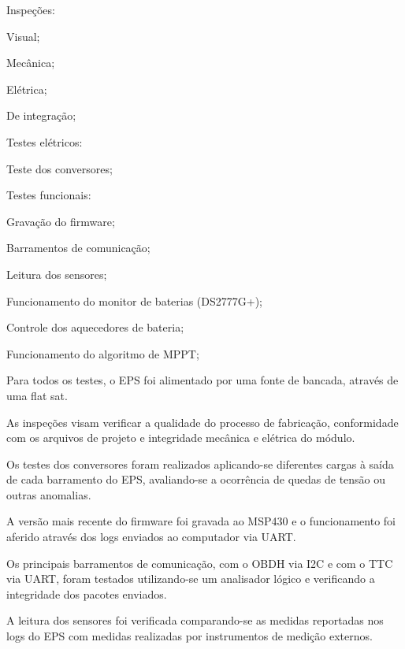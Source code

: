 \begin{alineas}
    \item Inspeções:
    \begin{alineas}
        \item Visual;
        \item Mecânica;
        \item Elétrica;
        \item De integração;
    \end{alineas}
    \item Testes elétricos:
    \begin{alineas}
        \item Teste dos conversores;
    \end{alineas}
    \item Testes funcionais:
    \begin{alineas}
        \item Gravação do firmware;
        \item Barramentos de comunicação;
        \item Leitura dos sensores;
        \item Funcionamento do monitor de baterias (DS2777G+);
        \item Controle dos aquecedores de bateria;
        \item Funcionamento do algoritmo de \gls{MPPT};
    \end{alineas}
\end{alineas}

Para todos os testes, o \gls{EPS} foi alimentado por uma fonte de bancada, através de uma flat sat.

As inspeções visam verificar a qualidade do processo de fabricação, conformidade com os arquivos de projeto e integridade mecânica e elétrica do módulo.

Os testes dos conversores foram realizados aplicando-se diferentes cargas à saída de cada barramento do \gls{EPS}, avaliando-se a ocorrência de quedas de tensão ou outras anomalias.

A versão mais recente do firmware foi gravada ao MSP430 e o funcionamento foi aferido através dos logs enviados ao computador via \gls{UART}.

Os principais barramentos de comunicação, com o \gls{OBDH} via \gls{I2C} e com o \gls{TTC} via \gls{UART}, foram testados utilizando-se um analisador lógico e verificando a integridade dos pacotes enviados.

A leitura dos sensores foi verificada comparando-se as medidas reportadas nos logs do \gls{EPS} com medidas realizadas por instrumentos de medição externos.


